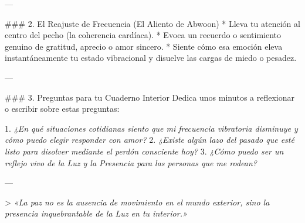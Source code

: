 \documentclass[12pt,twoside,openany]{book}
\begin{document}
---

### 2. El Reajuste de Frecuencia (El Aliento de Abwoon)
* Lleva tu atención al centro del pecho (la coherencia cardíaca).
* Evoca un recuerdo o sentimiento genuino de gratitud, aprecio o amor sincero.
* Siente cómo esa emoción eleva instantáneamente tu estado vibracional y disuelve las cargas de miedo o pesadez.

---

### 3. Preguntas para tu Cuaderno Interior
Dedica unos minutos a reflexionar o escribir sobre estas preguntas:

1. \textit{¿En qué situaciones cotidianas siento que mi frecuencia vibratoria disminuye y cómo puedo elegir responder con amor?}
2. \textit{¿Existe algún lazo del pasado que esté listo para disolver mediante el perdón consciente hoy?}
3. \textit{¿Cómo puedo ser un reflejo vivo de la Luz y la Presencia para las personas que me rodean?}

---

> \textit{«La paz no es la ausencia de movimiento en el mundo exterior, sino la presencia inquebrantable de la Luz en tu interior.»}

\newpage
\end{document}
